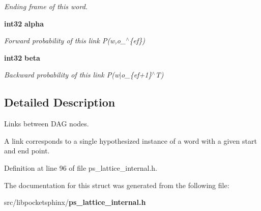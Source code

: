 \begin{DoxyCompactItemize}
\begin{DoxyCompactList}\small\item\em \-Ending frame of this word. \end{DoxyCompactList}\item 
{\bf int32} {\bf alpha}\label{structps__latlink__s_ad2f031d271f1d875223aae33116d3f40}

\begin{DoxyCompactList}\small\item\em \-Forward probability of this link \-P(w,o\-\_$^\wedge$\{ef\}) \end{DoxyCompactList}\item 
{\bf int32} {\bf beta}\label{structps__latlink__s_a4c27cd5d4f514832d3d46993e2ee87df}

\begin{DoxyCompactList}\small\item\em \-Backward probability of this link \-P(w$|$o\-\_\-\{ef+1\}$^\wedge$\-T) \end{DoxyCompactList}\end{DoxyCompactItemize}


\subsection{\-Detailed \-Description}
\-Links between \-D\-A\-G nodes. 

\-A link corresponds to a single hypothesized instance of a word with a given start and end point. 

\-Definition at line 96 of file ps\-\_\-lattice\-\_\-internal.\-h.



\-The documentation for this struct was generated from the following file\-:\begin{DoxyCompactItemize}
\item 
src/libpocketsphinx/{\bf ps\-\_\-lattice\-\_\-internal.\-h}\end{DoxyCompactItemize}
